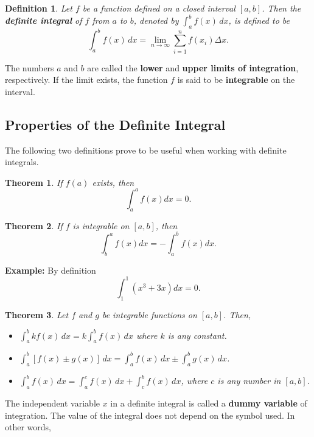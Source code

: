 \documentclass[titlepage,a4paper,12pt]{report}
\newtheorem{definition}{Definition}[section]
\newtheorem{theorem}{Theorem}[section]
\begin{document}
\begin{definition}
Let $f$ be a function defined on a closed interval $[a,b]$. Then the \textbf{definite integral} of $f$ from $a$ to $b$, denoted by $\displaystyle \int _{a}^b f(x)\, dx$, is defined to be 
\begin{equation*}
\int _{a}^b f(x)\, dx =\lim _{n\rightarrow \infty}\sum _{i=1}^n f(x_i)\Delta x.
\end{equation*}
\end{definition}
\noindent The numbers $a$ and $b$ are called the \textbf{lower} and \textbf{upper limits of integration}, respectively. If the limit exists, the function $f$ is said to be \textbf{integrable} on the interval. 
\subsection{Properties of the Definite Integral}
The following two definitions prove to be useful when working with definite integrals.
\begin{theorem}
If $f(a)$ exists, then 
\begin{equation*}
\int _a^a f(x)dx=0.
\end{equation*}
\end{theorem}
\begin{theorem}
If $f$ is integrable on $[a,b]$, then 
\begin{equation*}
\int _b^a f(x)dx=-\int _a^b f(x)dx.
\end{equation*}
\end{theorem}
\noindent \textbf{Example:} By definition 
\begin{equation*}
\int _1^1 (x^3+3x)dx=0.
\end{equation*}
\begin{theorem}
Let $f$ and $g$ be integrable functions on $[a,b]$. Then, 
\begin{itemize}
\item[(i)] $\displaystyle \int _{a}^b kf(x)\, dx=k\int _{a}^b f(x)\, dx$ where $k$ is any constant.
\item[(ii)] $\displaystyle \int _{a}^b [ f(x) \pm g(x)]\, dx=\int _{a}^b f(x)\, dx \pm \int _{a}^b g(x)\, dx$.
\item[(iii)] $\displaystyle \int _{a}^b f(x)\, dx=\int _{a}^c f(x)\, dx +\int _{c}^b f(x)\, dx$, where $c$ is any number in $[a,b]$.
\end{itemize}
\end{theorem}
\noindent The independent variable $x$ in a definite integral is called a \textbf{dummy variable} of integration. The value of the integral does not depend on the symbol used. In other words, 
\end{document}
